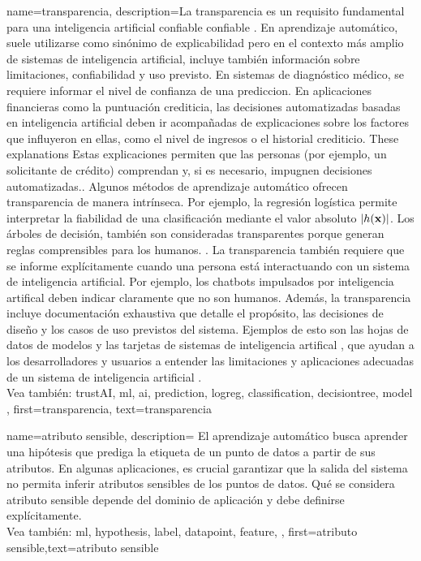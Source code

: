 {name={transparencia},
	description={La transparencia es un requisito fundamental para una 
		inteligencia artificial confiable confiable \cite{HLEGTrustworhtyAI}. En aprendizaje automático,
		suele utilizarse como sinónimo de explicabilidad \cite{gallese2023ai,JunXML2020}
		pero en el contexto más amplio de sistemas de inteligencia artificial, 
		incluye también información sobre limitaciones, confiabilidad y uso previsto. 
		En sistemas de diagnóstico médico, se requiere informar el nivel de confianza de una prediccion.
		En aplicaciones financieras como la puntuación crediticia, las decisiones automatizadas basadas en inteligencia artificial
		deben ir acompañadas de explicaciones sobre los factores que influyeron en ellas, como el nivel de ingresos o el historial crediticio. These explanations 
		Estas explicaciones permiten que las personas (por ejemplo, un solicitante de crédito) comprendan y, 
		si es necesario, impugnen decisiones automatizadas.. 
		Algunos métodos de aprendizaje automático ofrecen transparencia de manera intrínseca. Por ejemplo, la regresión logística 
		permite interpretar la fiabilidad de una clasificación mediante el valor absoluto $|h({\bf x})|$. 
		Los árboles de decisión, también son consideradas transparentes porque generan reglas comprensibles para los humanos.
		\cite{rudin2019stop}.
		La transparencia también requiere que se informe explícitamente cuando una persona está interactuando con un sistema de inteligencia artificial.
		Por ejemplo, los chatbots impulsados por inteligencia artifical deben indicar claramente que no son humanos. 
		Además, la transparencia incluye documentación exhaustiva que detalle el propósito, las decisiones de diseño y los casos de uso previstos del sistema.
		Ejemplos de esto son las hojas de datos de modelos \cite{DatasheetData2021}
		 y las tarjetas de sistemas de inteligencia artifical \cite{10.1145/3287560.3287596}, 
		 que ayudan a los desarrolladores y usuarios a entender las limitaciones y aplicaciones adecuadas de un sistema de inteligencia artificial \cite{Shahriari2017}.
		 \\
		Vea también: \gls{trustAI}, \gls{ml}, \gls{ai}, \gls{prediction}, \gls{logreg}, \gls{classification}, \gls{decisiontree}, \gls{model} },
	first={transparencia}, text={transparencia} 
}


{
	name=atributo sensible,
	description={
		El aprendizaje automático busca aprender una hipótesis que prediga la etiqueta de un punto de datos a partir de sus atributos.
		En algunas aplicaciones, es crucial garantizar que la salida del sistema no permita inferir atributos sensibles de los puntos de datos. 
		Qué se considera atributo sensible depende del dominio de aplicación y debe definirse explícitamente.
		\\
		Vea también: \gls{ml}, \gls{hypothesis}, \gls{label}, \gls{datapoint}, \gls{feature},  },
	first={atributo sensible},text={atributo sensible}
}

